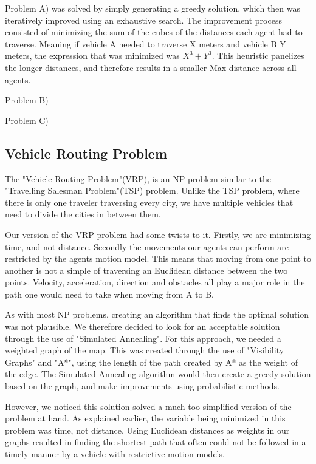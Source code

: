 \documentclass[a4paper,12pt]{article}
\begin{document}
Problem A) was solved by simply generating a greedy solution, which then was iteratively improved using an exhaustive search. The improvement process consisted of minimizing the sum of the cubes of the distances each agent had to traverse.
Meaning if vehicle A needed to traverse X meters and vehicle B Y meters, the expression that was minimized was $X^3+Y^3$. This heuristic panelizes the longer distances, and therefore results in a smaller Max distance across all agents.

Problem B)  

Problem C)     

\subsection{Vehicle Routing Problem}
\label{sec:pf}

The "Vehicle Routing Problem"(VRP), is an NP problem similar to the "Travelling Salesman Problem"(TSP) problem. Unlike the TSP problem, where there is only one traveler traversing every city, we have multiple vehicles that need to divide the cities in between them. 

Our version of the VRP problem had some twists to it.
Firstly, we are minimizing time, and not distance. Secondly the movements our agents can perform are restricted by the agents motion model. 
This means that moving from one point to another is not a simple of traversing an Euclidean distance between the two points. Velocity, acceleration, direction and obstacles all play a major role in the path one would need to take when moving from A to B.

As with most NP problems, creating an algorithm that finds the optimal solution was not plausible. We therefore decided to look for an acceptable solution through the use of "Simulated Annealing".
For this approach, we needed a weighted graph of the map. This was created through the use of "Visibility Graphs" and "A*", using the length of the path created by A* as the weight of the edge. The Simulated Annealing algorithm would then create a greedy solution based on the graph, and make improvements using probabilistic methods.

However, we noticed this solution solved a much too simplified version of the problem at hand.  As explained earlier, the variable being minimized in this problem was time, not distance. Using Euclidean distances as weights in our graphs resulted in finding the shortest path that often could not be followed in a timely manner by a vehicle with restrictive motion models.
\end{document}
